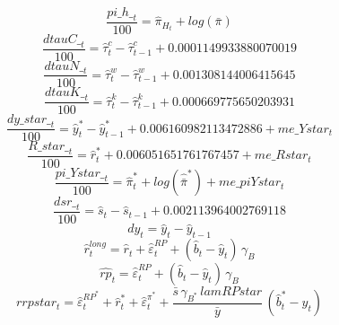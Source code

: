 \begin{dmath}
\frac{{pi\_h\__{t}}}{100}={\hat{\pi}_{H}_{t}}+log\left({\bar{\pi}}\right)
\end{dmath}
\begin{dmath}
\frac{{dtauC\__{t}}}{100}={\hat{\tau}^c_{t}}-{\hat{\tau}^c_{t-1}}+0.0001149933880070019
\end{dmath}
\begin{dmath}
\frac{{dtauN\__{t}}}{100}={\hat{\tau}^w_{t}}-{\hat{\tau}^w_{t-1}}+0.001308144006415645
\end{dmath}
\begin{dmath}
\frac{{dtauK\__{t}}}{100}={\hat{\tau}^k_{t}}-{\hat{\tau}^k_{t-1}}+0.000669775650203931
\end{dmath}
\begin{dmath}
\frac{{dy\_star\__{t}}}{100}={\hat{y}^*_{t}}-{\hat{y}^*_{t-1}}+0.006160982113472886+{me\_Ystar_{t}}
\end{dmath}
\begin{dmath}
\frac{{R\_star\__{t}}}{100}={\hat{r}^*_{t}}+0.006051651761767457+{me\_Rstar_{t}}
\end{dmath}
\begin{dmath}
\frac{{pi\_Ystar\__{t}}}{100}={\hat{\pi}^*_{t}}+log\left({\hat{\bar{\pi}}^*}\right)+{me\_piYstar_{t}}
\end{dmath}
\begin{dmath}
\frac{{dsr\__{t}}}{100}={\hat{s}_{t}}-{\hat{s}_{t-1}}+0.002113964002769118
\end{dmath}
\begin{dmath}
{dy_{t}}={\hat{y}_{t}}-{\hat{y}_{t-1}}
\end{dmath}
\begin{dmath}
{\hat{r}^{long}_{t}}={\hat{r}_{t}}+{\hat{\varepsilon}^{RP}_{t}}+\left({\hat{b}_{t}}-{\hat{y}_{t}}\right)\, {\gamma_{B}}
\end{dmath}
\begin{dmath}
{\hat{rp}_{t}}={\hat{\varepsilon}^{RP}_{t}}+\left({\hat{b}_{t}}-{\hat{y}_{t}}\right)\, {\gamma_{B}}
\end{dmath}
\begin{dmath}
{rrpstar_{t}}={\hat{\varepsilon}^{RP^*}_{t}}+{\hat{r}^*_{t}}+{\hat{\varepsilon}^{\pi^*}_{t}}+\frac{{\bar{s}}\, {\gamma_{B^*}}\, {lamRPstar}}{{\bar{y}}}\, \left({\hat{b}^*_{t}}-{\hat{y}_{t}}\right)
\end{dmath}
